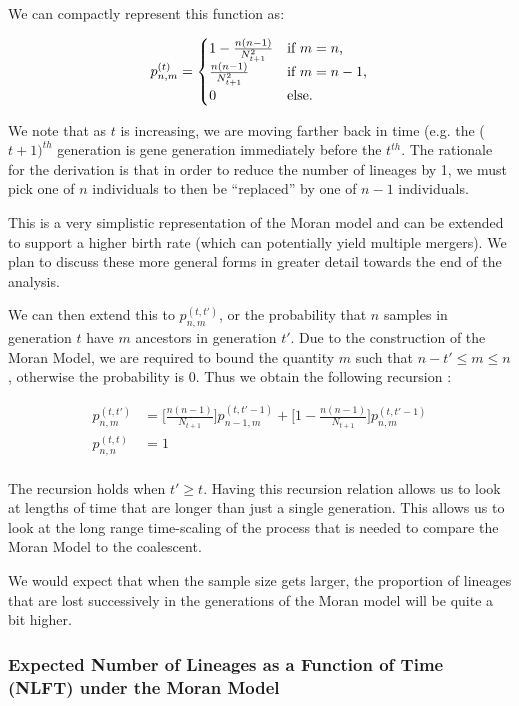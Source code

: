 \documentclass[10pt]{article}
\begin{document}
We can compactly represent this function as:

\begin{equation*}
	p^{(t)}_{n,m} = 
	\begin{cases} 1 - \frac{n(n-1)}{N^2_{t+1}}  & \text{if $m = n$,}
		\\
		\frac{n(n-1)}{N^2_{t+1}} &\text{if $ m = n - 1$,}
		\\
		0 &\text{else.}
	\end{cases}
\end{equation*}

We note that as $t$ is increasing, we are moving farther back in time (e.g. the ($t+1)^{th}$ generation is gene generation immediately before the $t^{th}$. The rationale for the derivation is that in order to reduce the number of lineages by 1, we must pick one of $n$ individuals to then be ``replaced'' by one of $n-1$ individuals. 

This is a very simplistic representation of the Moran model and can be extended to support a higher birth rate (which can potentially yield multiple mergers). We plan to discuss these more general forms in greater detail towards the end of the analysis. 

We can then extend this to $p^{(t, t')}_{n,m}$, or the probability that $n$ samples in generation $t$ have $m$  ancestors in generation $t'$. Due to the construction of the Moran Model, we are required to bound the quantity $m$ such that $n-t' \leq m \leq n$, otherwise the probability is $0$. Thus we obtain the following recursion :

$$
\begin{aligned}
	p^{(t, t')}_{n,m} &= \Bigg[\frac{n(n-1)}{N_{t+1}}\Bigg] p^{(t, t'-1)}_{n-1, m} + \Bigg[1 - \frac{n(n-1)}{N_{t+1}}\Bigg] p^{(t, t'-1)}_{n,m}\\
	p^{(t, t)}_{n,n} &= 1\\
\end{aligned}
$$

The recursion holds when $t' \geq t$. Having this recursion relation allows us to look at lengths of time that are longer than just a single generation. This allows us to look at the long range time-scaling of the process that is needed to compare the Moran Model to the coalescent. 

We would expect that when the sample size gets larger, the proportion of lineages that are lost successively in the generations of the Moran model will be quite a bit higher. 

\subsubsection{Expected Number of Lineages as a Function of Time (NLFT) under the Moran Model}
\end{document}
